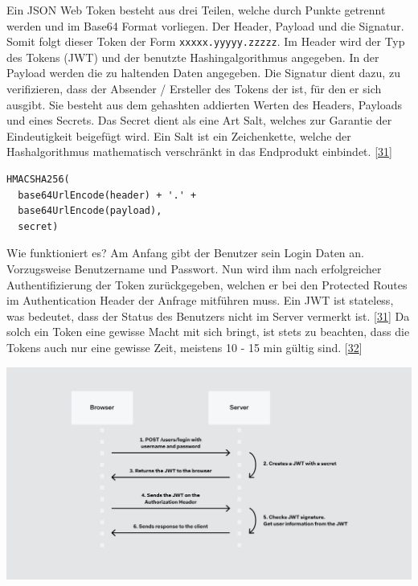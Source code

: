 \documentclass[
    headings=optiontotocandhead,%
    twoside,
    numbers=noenddot,%
    12pt, %
    titlepage, %
    parskip=full, %
    listof=leveldown, 
    numbers=noenddot, %
    a4paper,DIV=14,
    BCOR=15mm,
]{scrbook}
\newcommand{\passthrough}[1]{#1}
\let\origfigure=\figure
\let\endorigfigure=\endfigure
\renewenvironment{figure}[1][]{%
   \origfigure[H]
}{%
   \endorigfigure
}
\begin{document}
Ein JSON Web Token besteht aus drei Teilen, welche durch Punkte getrennt
werden und im Base64 Format vorliegen. Der Header, Payload und die
Signatur. Somit folgt dieser Token der Form
\passthrough{\lstinline!xxxxx.yyyyy.zzzzz!}. Im Header wird der Typ des
Tokens (JWT) und der benutzte Hashingalgorithmus angegeben. In der
Payload werden die zu haltenden Daten angegeben. Die Signatur dient
dazu, zu verifizieren, dass der Absender / Ersteller des Tokens der ist,
für den er sich ausgibt. Sie besteht aus dem gehashten addierten Werten
des Headers, Payloads und eines Secrets. Das Secret dient als eine Art
Salt, welches zur Garantie der Eindeutigkeit beigefügt wird. Ein Salt
ist ein Zeichenkette, welche der Hashalgorithmus mathematisch
verschränkt in das Endprodukt einbindet.
{[}\protect\hyperlink{ref-jwt}{31}{]}

\begin{lstlisting}[caption={HMAC SHA256 Signatur eines JWT}]
HMACSHA256(
  base64UrlEncode(header) + '.' +
  base64UrlEncode(payload),
  secret)
\end{lstlisting}

Wie funktioniert es? Am Anfang gibt der Benutzer sein Login Daten an.
Vorzugsweise Benutzername und Passwort. Nun wird ihm nach erfolgreicher
Authentifizierung der Token zurückgegeben, welchen er bei den Protected
Routes im Authentication Header der Anfrage mitführen muss. Ein JWT ist
stateless, was bedeutet, dass der Status des Benutzers nicht im Server
vermerkt ist. {[}\protect\hyperlink{ref-jwt}{31}{]} Da solch ein Token
eine gewisse Macht mit sich bringt, ist stets zu beachten, dass die
Tokens auch nur eine gewisse Zeit, meistens 10 - 15 min gültig sind.
{[}\protect\hyperlink{ref-medium-auth-simple}{32}{]}

\begin{figure}
\centering
\includegraphics[width=1\textwidth,height=\textheight]{img/Schrempf/jwt-auth-process.png}
\caption{JWT Authentikationsablauf
{[}\protect\hyperlink{ref-jwt}{31}{]}}
\end{figure}
\end{document}
